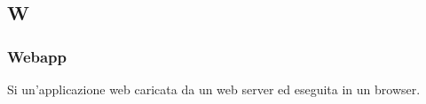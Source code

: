 \subsection{W}

\subsubsection{Webapp}
Si un'applicazione web caricata da un web server ed eseguita in un browser.

\newpage
